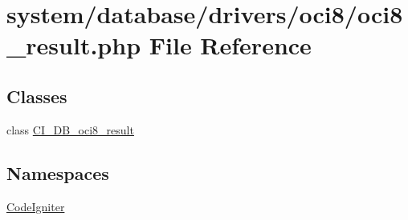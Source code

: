 \hypertarget{oci8__result_8php}{}\section{system/database/drivers/oci8/oci8\+\_\+result.php File Reference}
\label{oci8__result_8php}
\subsection*{Classes}
\begin{DoxyCompactItemize}
\item 
class \mbox{\hyperlink{class_c_i___d_b__oci8__result}{C\+I\+\_\+\+D\+B\+\_\+oci8\+\_\+result}}
\end{DoxyCompactItemize}
\subsection*{Namespaces}
\begin{DoxyCompactItemize}
\item 
 \mbox{\hyperlink{namespace_code_igniter}{Code\+Igniter}}
\end{DoxyCompactItemize}
